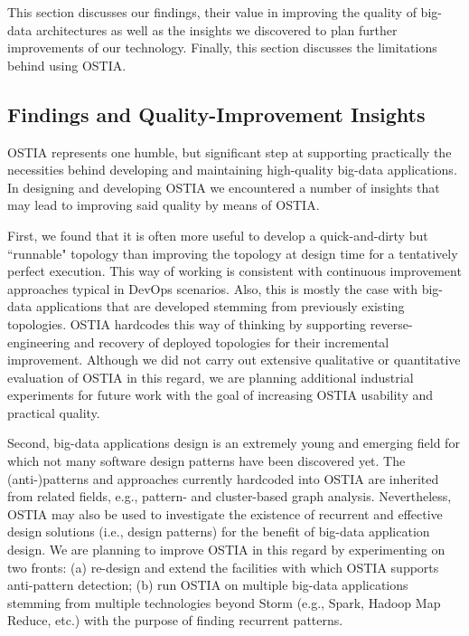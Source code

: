 This section discusses our findings, their value in improving the quality of big-data architectures as well as the insights we discovered to plan further improvements of our technology. Finally, this section discusses the limitations behind using OSTIA.

\subsection{Findings and Quality-Improvement Insights}
OSTIA represents one humble, but significant step at supporting practically the necessities behind developing and maintaining high-quality big-data applications. In designing and developing OSTIA we encountered a number of insights that may lead to improving said quality by means of OSTIA.

First, we found that it is often more useful to develop a quick-and-dirty but ``runnable" topology than improving the topology at design time for a tentatively perfect execution. This way of working is consistent with continuous improvement approaches typical in DevOps scenarios. Also, this is mostly the case with big-data applications that are developed stemming from previously existing topologies. OSTIA hardcodes this way of thinking by supporting reverse-engineering and recovery of deployed topologies for their incremental improvement. Although we did not carry out extensive qualitative or quantitative evaluation of OSTIA in this regard, we are planning additional industrial experiments for future work with the goal of increasing OSTIA usability and practical quality.

Second, big-data applications design is an extremely young and emerging field for which not many software design patterns have been discovered yet. The (anti-)patterns and approaches currently hardcoded into OSTIA are inherited from related fields, e.g., pattern- and cluster-based graph analysis. Nevertheless, OSTIA may also be used to investigate the existence of recurrent and effective design solutions (i.e., design patterns) for the benefit of big-data application design. We are planning to improve OSTIA in this regard by experimenting on two fronts: (a) re-design and extend the facilities with which OSTIA supports anti-pattern detection; (b) run OSTIA on multiple big-data applications stemming from multiple technologies beyond Storm (e.g., Spark, Hadoop Map Reduce, etc.) with the purpose of finding recurrent patterns. 

